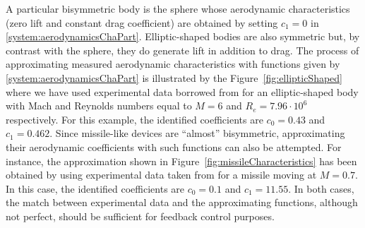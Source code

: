 \documentclass[twocolumn]{autart}
\theoremstyle{definition}
\theoremstyle{definition}
\begin{document}
A particular bisymmetric body is the sphere whose aerodynamic characteristics (zero lift and constant drag coefficient) are obtained by setting $c_1=0$ in \eqref{system:aerodynamicsChaPart}.
Elliptic-shaped bodies are also symmetric but, by contrast with the sphere, they do generate lift in addition to drag. The process of approximating measured aerodynamic characteristics with functions given by \eqref{system:aerodynamicsChaPart} is illustrated by the Figure~\ref{fig:ellipticShaped} where we have used experimental data borrowed from \cite[p.19]{1965_WAYNE} for an elliptic-shaped body with Mach and Reynolds numbers equal to $M = 6$ and $R_e = 7.96\cdot 10^6$ respectively. For this example, the identified coefficients are $c_0=0.43$ and $c_1=0.462$. Since missile-like devices are ``almost'' bisymmetric, approximating their aerodynamic coefficients with such functions can also be attempted. For instance, the approximation shown in Figure~\ref{fig:missileCharacteristics} has been obtained by using experimental data taken from \cite[p.54]{1971_SAFFEL} for a missile moving at $M = 0.7$. In this case, the identified coefficients are $c_0=0.1$ and $c_1=11.55$. In both cases, the match between 
experimental data and the approximating functions, although not perfect, should be sufficient for feedback control purposes.
\end{document}
